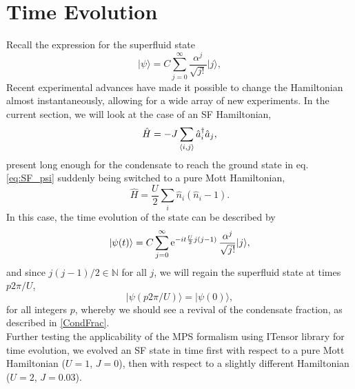 \section{Time Evolution}
Recall the expression for the superfluid state
\begin{equation}\label{eq:SF_psi}
\lvert \psi \rangle = C \sum_{j=0}^{\infty} \frac{\alpha^j}{\sqrt{j!}}\lvert j\rangle,
\end{equation}
Recent experimental advances have made it possible to change the Hamiltonian almost instantaneously, allowing for a wide array of new experiments. In the current section, we will look at the case of an SF Hamiltonian,
\begin{equation}\label{eq:SF_ham}
\hat{H} = -J \sum_{\braket{i,j}} \hat{a}_{i}^{\dag} \hat{a}_j,
\end{equation}
 present long enough for the condensate to reach the ground state in eq. \eqref{eq:SF_psi} suddenly being switched to a pure Mott Hamiltonian,
\begin{equation}
 \hat{H} = \frac{U}{2} \sum_{i} \hat{n}_i \left( \hat{n}_i -1 \right).
\end{equation}
%
In this case, the time evolution of the state can be described by
\begin{equation}
\lvert \psi (t) \rangle = C \sum_{j=0}^{\infty} \operatorname{e}^{-it \frac{U}{2} j(j-1)}\frac{\alpha^j}{\sqrt{j!}}\lvert j\rangle,
\end{equation}
and since $j(j-1)/2\in \mathbb{N}$ for all $j$, we will regain the superfluid state at times $p2\pi/U$,
\begin{equation}
\lvert \psi (p2\pi/U) \rangle = \lvert \psi (0) \rangle,
\end{equation}
for all integers $p$, whereby we should see a revival of the condensate fraction, as described in \ref{CondFrac}.\\

Further testing the applicability of the MPS formalism using ITensor library for time evolution, we evolved an SF state in time first with respect to a pure Mott Hamiltonian ($U=1$, $J=0$), then with respect to a slightly different Hamiltonian ($U=2$, $J=0.03$).

